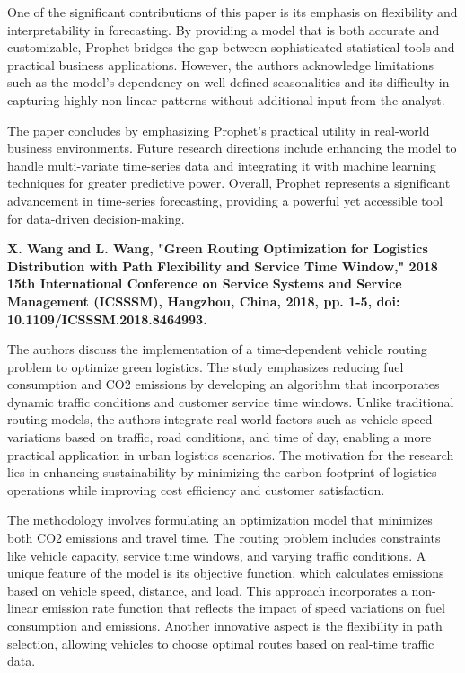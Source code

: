 One of the significant contributions of this paper is its emphasis on flexibility and interpretability in forecasting. By providing a model that is both accurate and customizable, Prophet bridges the gap between sophisticated statistical tools and practical business applications. However, the authors acknowledge limitations such as the model's dependency on well-defined seasonalities and its difficulty in capturing highly non-linear patterns without additional input from the analyst.

The paper concludes by emphasizing Prophet’s practical utility in real-world business environments. Future research directions include enhancing the model to handle multi-variate time-series data and integrating it with machine learning techniques for greater predictive power. Overall, Prophet represents a significant advancement in time-series forecasting, providing a powerful yet accessible tool for data-driven decision-making.

\textbf{\cite{wang2018greenrouting}X. Wang and L. Wang, "Green Routing Optimization for Logistics Distribution with Path Flexibility and Service Time Window," 2018 15th International Conference on Service Systems and Service Management (ICSSSM), Hangzhou, China, 2018, pp. 1-5, doi: 10.1109/ICSSSM.2018.8464993.}

The authors discuss the implementation of a time-dependent vehicle routing problem to optimize green logistics. The study emphasizes reducing fuel consumption and CO2 emissions by developing an algorithm that incorporates dynamic traffic conditions and customer service time windows. Unlike traditional routing models, the authors integrate real-world factors such as vehicle speed variations based on traffic, road conditions, and time of day, enabling a more practical application in urban logistics scenarios. The motivation for the research lies in enhancing sustainability by minimizing the carbon footprint of logistics operations while improving cost efficiency and customer satisfaction.

The methodology involves formulating an optimization model that minimizes both CO2 emissions and travel time. The routing problem includes constraints like vehicle capacity, service time windows, and varying traffic conditions. A unique feature of the model is its objective function, which calculates emissions based on vehicle speed, distance, and load. This approach incorporates a non-linear emission rate function that reflects the impact of speed variations on fuel consumption and emissions. Another innovative aspect is the flexibility in path selection, allowing vehicles to choose optimal routes based on real-time traffic data.

